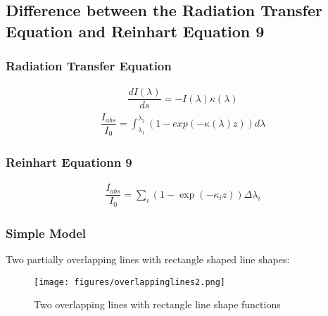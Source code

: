 \subsection{Difference between the Radiation Transfer Equation and Reinhart Equation 9}

\subsubsection{Radiation Transfer Equation}

\begin{align}
	\dfrac{d I(\lambda)}{ds} = - I(\lambda) \kappa(\lambda)
\end{align}
\begin{align}
	\dfrac{I_{abs}}{I_0} = \int_{\lambda_1}^{\lambda_2} \left(1 - exp(-\kappa(\lambda) z)\right) d \lambda
\end{align}

\subsubsection{Reinhart Equationn 9}

\begin{align}
	\dfrac{I_{abs}}{I_0} = \sum_i (1 - \exp(-\kappa_i z)) \Delta \lambda_i
\end{align}

\subsubsection{Simple Model}

Two partially overlapping lines with rectangle shaped line shapes:
\begin{figure}[ht]
	\texttt{[image: figures/overlappinglines2.png]}
	\caption{Two overlapping lines with rectangle line shape functions}
	\label{fig:overlappinglines}
\end{figure}


